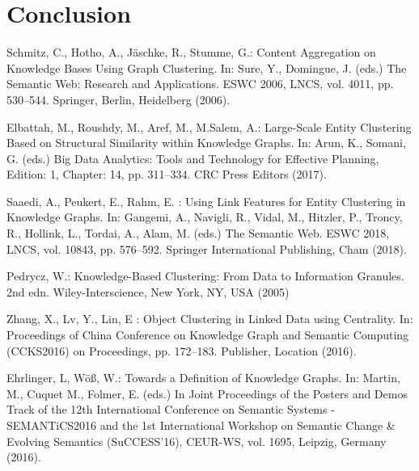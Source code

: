 \documentclass[runningheads]{llncs}
\begin{document}
\section{Conclusion} \label{conclusion}

%
%
%


%
\begin{thebibliography}{8}
Schmitz, C., Hotho, A., J{\"a}schke, R., Stumme, G.: Content Aggregation on Knowledge Bases Using Graph Clustering. In: Sure, Y., Domingue, J. (eds.) The Semantic Web: Research and Applications. ESWC 2006, LNCS, vol. 4011, pp. 530--544.
Springer, Berlin, Heidelberg (2006). 

Elbattah, M., Roushdy, M., Aref, M., M.Salem, A.: Large-Scale Entity Clustering Based on Structural Similarity within Knowledge Graphs. In: Arun, K., Somani, G. (eds.) Big Data Analytics: Tools and Technology for Effective Planning, Edition: 1, Chapter: 14, pp. 311--334. CRC Press Editors (2017). 

Saaedi, A., Peukert, E., Rahm, E.  : Using Link Features for Entity Clustering in Knowledge Graphs. In: Gangemi, A., Navigli, R., Vidal, M., Hitzler, P., Troncy, R., Hollink, L., Tordai, A., Alam, M. (eds.) The Semantic Web. ESWC 2018, LNCS, vol. 10843, pp. 576--592.
Springer International Publishing, Cham (2018). 

Pedrycz, W.: Knowledge-Based Clustering: From Data to Information Granules. 2nd edn. Wiley-Interscience, New York, NY, USA (2005)

Zhang, X., Lv, Y., Lin, E : Object Clustering in Linked Data using Centrality. In: Proceedings of China Conference on Knowledge Graph and Semantic Computing (CCKS2016)
on Proceedings, pp. 172--183. Publisher, Location (2016). 

Ehrlinger, L, W{\"o}{\ss}, W.: Towards a Definition of Knowledge Graphs. In: Martin, M., Cuquet M., Folmer, E. (eds.) In Joint Proceedings of the Posters and Demos Track of the 12th International Conference on Semantic Systems - SEMANTiCS2016 and the 1st International Workshop on Semantic Change \& Evolving Semantics (SuCCESS'16), CEUR-WS, vol. 1695, Leipzig, Germany (2016). 


\end{thebibliography}
\end{document}
